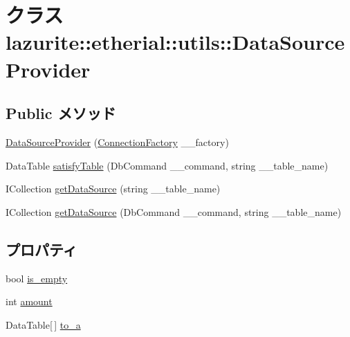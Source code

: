 \hypertarget{classlazurite_1_1etherial_1_1utils_1_1_data_source_provider}{
\section{クラス lazurite::etherial::utils::DataSourceProvider}
\label{classlazurite_1_1etherial_1_1utils_1_1_data_source_provider}
}
\subsection*{Public メソッド}
\begin{DoxyCompactItemize}
\item 
\hyperlink{classlazurite_1_1etherial_1_1utils_1_1_data_source_provider_ab3d9bd0b30a730aa08e1aca8d5bea1b9}{DataSourceProvider} (\hyperlink{classlazurite_1_1etherial_1_1utils_1_1_connection_factory}{ConnectionFactory} \_\-\_\-factory)
\item 
DataTable \hyperlink{classlazurite_1_1etherial_1_1utils_1_1_data_source_provider_abea4ea63fddd20c45edb4ee761c16171}{satisfyTable} (DbCommand \_\-\_\-command, string \_\-\_\-table\_\-name)
\item 
ICollection \hyperlink{classlazurite_1_1etherial_1_1utils_1_1_data_source_provider_ae03985b347b34ec696275e9b8ffc7b71}{getDataSource} (string \_\-\_\-table\_\-name)
\item 
ICollection \hyperlink{classlazurite_1_1etherial_1_1utils_1_1_data_source_provider_aab623559257d968b2bd096dee9233a4b}{getDataSource} (DbCommand \_\-\_\-command, string \_\-\_\-table\_\-name)
\end{DoxyCompactItemize}
\subsection*{プロパティ}
\begin{DoxyCompactItemize}
\item 
bool \hyperlink{classlazurite_1_1etherial_1_1utils_1_1_data_source_provider_ad53038aae9b74df2f3a02586d6412b8d}{is\_\-empty}
\item 
int \hyperlink{classlazurite_1_1etherial_1_1utils_1_1_data_source_provider_aacb1dce2fde3fbe638ded3c835cbf06f}{amount}
\item 
DataTable\mbox{[}$\,$\mbox{]} \hyperlink{classlazurite_1_1etherial_1_1utils_1_1_data_source_provider_afd3b581f89c22a1d8f6bd9d470154a9c}{to\_\-a}
\end{DoxyCompactItemize}


